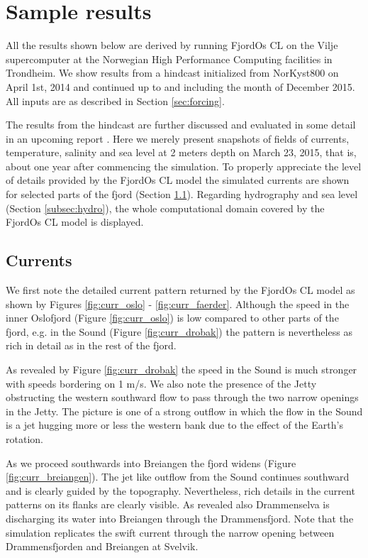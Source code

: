\section{Sample results}
\label{sec:resul}
All the results shown below are derived by running FjordOs CL on the Vilje supercomputer at the Norwegian High Performance Computing facilities in Trondheim. We show results from a hindcast initialized from NorKyst800 on April 1st, 2014 and continued up to and including the month of December 2015. All inputs are as described in Section \ref{sec:forcing}.
 
The results from the hindcast are further discussed and evaluated in some detail in an upcoming report \citep{hjelm:etal:2016}. Here we merely present snapshots of fields of currents, temperature, salinity and sea level at 2 meters depth on March 23, 2015, that is, about one year after commencing the simulation. To properly appreciate the level of details provided by the FjordOs CL model the simulated currents are shown for selected parts of the fjord (Section \ref{subsec:curre}). Regarding hydrography and sea level (Section \ref{subsec:hydro}), the whole computational domain covered by the FjordOs CL model is displayed.

\subsection{Currents}
\label{subsec:curre}
We first note the detailed current pattern returned by the FjordOs CL model as shown by Figures \ref{fig:curr_oslo} - \ref{fig:curr_faerder}. Although the speed in the inner Oslofjord (Figure \ref{fig:curr_oslo}) is low compared to other parts of the fjord, e.g. in the {\DR} Sound (Figure \ref{fig:curr_drobak}) the pattern is nevertheless as rich in detail as in the rest of the fjord. 
 
 
   

As revealed by Figure \ref{fig:curr_drobak} the speed in the {\DR} Sound is much stronger with speeds bordering on 1 m/s. We also note the presence of the Jetty obstructing the western southward flow to pass through the two narrow openings in the Jetty. The picture is one of a strong outflow in which the flow in the {\DR} Sound is a jet hugging more or less the western bank due to the effect of the Earth's rotation.   

As we proceed southwards into Breiangen the fjord widens (Figure \ref{fig:curr_breiangen}). The jet like outflow from the {\DR} Sound continues southward and is clearly guided by the topography. Nevertheless, rich details in the current patterns on its flanks  are clearly visible. As revealed also Drammenselva is discharging its water into Breiangen through the Drammensfjord. Note that the simulation replicates the swift current through the narrow opening between Drammensfjorden and Breiangen at Svelvik.  
% 
 

